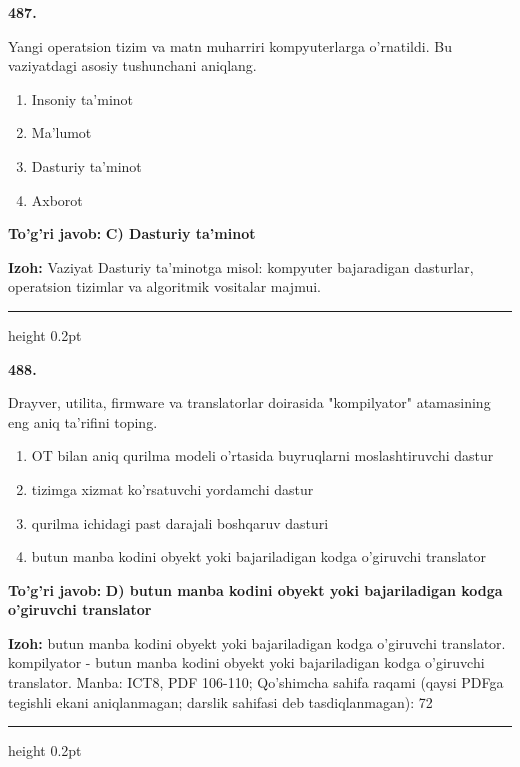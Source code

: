 \documentclass[10pt,a4paper]{article}
\begin{document}
{\bfseries\sffamily\color{ink} 487.}
\par
Yangi operatsion tizim va matn muharriri kompyuterlarga o'rnatildi. Bu vaziyatdagi asosiy tushunchani aniqlang.
\begin{enumerate}[label=\Alph*),leftmargin=9mm]
\item Insoniy ta'minot
\item Ma'lumot
\item Dasturiy ta'minot
\item Axborot
\end{enumerate}
\begin{tcolorbox}[enhanced,breakable,colback=teal!4,colframe=teal!60!black,boxrule=0.45pt,arc=1.2mm,left=2.7mm,right=2.7mm,top=1.8mm,bottom=1.8mm,before skip=2mm,after skip=2mm]
{\bfseries\sffamily\color{teal}To'g'ri javob:} \textbf{C) Dasturiy ta'minot}
\par\smallskip
{\bfseries Izoh:} Vaziyat Dasturiy ta'minotga misol: kompyuter bajaradigan dasturlar, operatsion tizimlar va algoritmik vositalar majmui.
\end{tcolorbox}
\vspace{2mm}\hrule height 0.2pt\vspace{3mm}

{\bfseries\sffamily\color{ink} 488.}
\par
Drayver, utilita, firmware va translatorlar doirasida "kompilyator" atamasining eng aniq ta'rifini toping.
\begin{enumerate}[label=\Alph*),leftmargin=9mm]
\item OT bilan aniq qurilma modeli o'rtasida buyruqlarni moslashtiruvchi dastur
\item tizimga xizmat ko'rsatuvchi yordamchi dastur
\item qurilma ichidagi past darajali boshqaruv dasturi
\item butun manba kodini obyekt yoki bajariladigan kodga o'giruvchi translator
\end{enumerate}
\begin{tcolorbox}[enhanced,breakable,colback=teal!4,colframe=teal!60!black,boxrule=0.45pt,arc=1.2mm,left=2.7mm,right=2.7mm,top=1.8mm,bottom=1.8mm,before skip=2mm,after skip=2mm]
{\bfseries\sffamily\color{teal}To'g'ri javob:} \textbf{D) butun manba kodini obyekt yoki bajariladigan kodga o'giruvchi translator}
\par\smallskip
{\bfseries Izoh:} butun manba kodini obyekt yoki bajariladigan kodga o'giruvchi translator. kompilyator - butun manba kodini obyekt yoki bajariladigan kodga o'giruvchi translator. Manba: ICT8, PDF 106-110; Qo'shimcha sahifa raqami (qaysi PDFga tegishli ekani aniqlanmagan; darslik sahifasi deb tasdiqlanmagan): 72
\end{tcolorbox}
\vspace{2mm}\hrule height 0.2pt\vspace{3mm}
\end{document}

